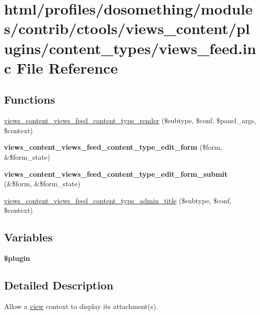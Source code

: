 \hypertarget{views__feed_8inc}{
\section{html/profiles/dosomething/modules/contrib/ctools/views\_\-content/plugins/content\_\-types/views\_\-feed.inc File Reference}
\label{views__feed_8inc}
}
\subsection*{Functions}
\begin{DoxyCompactItemize}
\item 
\hyperlink{views__feed_8inc_ac8b83a5b46a55fd6df3d05f52d11f88c}{views\_\-content\_\-views\_\-feed\_\-content\_\-type\_\-render} (\$subtype, \$conf, \$panel\_\-args, \$context)
\item 
\hypertarget{views__feed_8inc_a229e362b94f0242c16d2ca09ccc525dc}{
{\bfseries views\_\-content\_\-views\_\-feed\_\-content\_\-type\_\-edit\_\-form} (\$form, \&\$form\_\-state)}
\label{views__feed_8inc_a229e362b94f0242c16d2ca09ccc525dc}

\item 
\hypertarget{views__feed_8inc_a48314d51283dd695db3f6a4c5a440759}{
{\bfseries views\_\-content\_\-views\_\-feed\_\-content\_\-type\_\-edit\_\-form\_\-submit} (\&\$form, \&\$form\_\-state)}
\label{views__feed_8inc_a48314d51283dd695db3f6a4c5a440759}

\item 
\hyperlink{views__feed_8inc_a1bac7a09fef4b18cb154ed4b362541cf}{views\_\-content\_\-views\_\-feed\_\-content\_\-type\_\-admin\_\-title} (\$subtype, \$conf, \$context)
\end{DoxyCompactItemize}
\subsection*{Variables}
\begin{DoxyCompactItemize}
\item 
{\bfseries \$plugin}
\end{DoxyCompactItemize}


\subsection{Detailed Description}
Allow a \hyperlink{classview}{view} context to display its attachment(s). 

